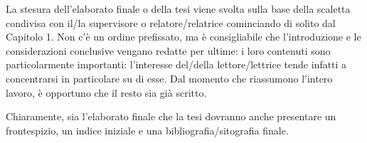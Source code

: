 La stesura dell'elaborato finale o della tesi viene svolta sulla base della scaletta condivisa con il/la supervisore o relatore/relatrice cominciando di solito dal Capitolo 1. Non c'è un ordine prefissato, ma è consigliabile che l'introduzione e le considerazioni conclusive vengano redatte per ultime: i loro contenuti sono particolarmente importanti: l'interesse del/della lettore/lettrice tende infatti a concentrarsi in particolare su di esse. Dal momento che riassumono l'intero lavoro, è opportuno
che il resto sia già scritto.

Chiaramente, sia l'elaborato finale che la tesi dovranno anche presentare un frontespizio, un indice iniziale e una bibliografia/sitografia finale.

